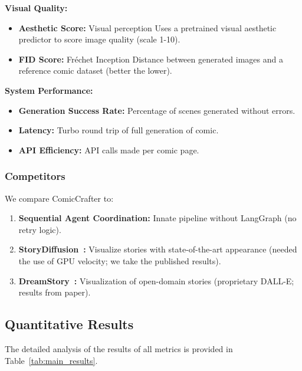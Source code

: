 \documentclass[runningheads]{llncs}
\begin{document}
\textbf{Visual Quality:}
\begin{itemize}
\item \textbf{Aesthetic Score:} Visual perception Uses a pretrained visual aesthetic predictor to score image quality (scale 1-10).
\item \textbf{FID Score:} Fréchet Inception Distance between generated images and a reference comic dataset (better the lower).
\end{itemize}

\textbf{System Performance:}
\begin{itemize}
\item \textbf{Generation Success Rate:} Percentage of scenes generated without errors.
\item \textbf{Latency:} Turbo round trip of full generation of comic.
\item \textbf{API Efficiency:} API calls made per comic page.
\end{itemize}

\subsubsection{Competitors}

We compare ComicCrafter to:
\begin{enumerate}
\item \textbf{Sequential Agent Coordination:} Innate pipeline without LangGraph (no retry logic).
\item \textbf{StoryDiffusion~\cite{zhou2024storydiffusion}:} Visualize stories with state-of-the-art appearance (needed the use of GPU velocity; we take the published results).
\item \textbf{DreamStory~\cite{he2024dreamstory}:} Visualization of open-domain stories (proprietary DALL-E; results from paper).
\end{enumerate}

\subsection{Quantitative Results}

The detailed analysis of the results of all metrics is provided in Table~\ref{tab:main_results}.
\end{document}
